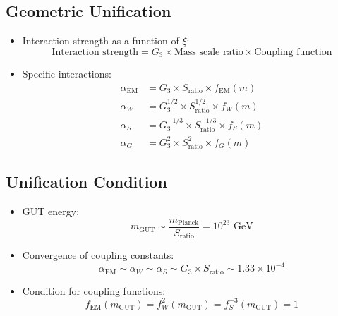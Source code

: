 \documentclass[12pt,a4paper]{article}
\begin{document}
	\subsection{Geometric Unification}
	\begin{itemize}
		\item Interaction strength as a function of $\xi$:
		\begin{equation}
			\text{Interaction strength} = G_3 \times \text{Mass scale ratio} \times \text{Coupling function}
		\end{equation}
		
		\item Specific interactions:
		\begin{align}
			\alpha_{\text{EM}} &= G_3 \times S_{\text{ratio}} \times f_{\text{EM}}(m) \\
			\alpha_W &= G_3^{1/2} \times S_{\text{ratio}}^{1/2} \times f_W(m) \\
			\alpha_S &= G_3^{-1/3} \times S_{\text{ratio}}^{-1/3} \times f_S(m) \\
			\alpha_G &= G_3^2 \times S_{\text{ratio}}^2 \times f_G(m)
		\end{align}
	\end{itemize}
	
	\subsection{Unification Condition}
	\begin{itemize}
		\item GUT energy:
		\begin{equation}
			m_{\text{GUT}} \sim \frac{m_{\text{Planck}}}{S_{\text{ratio}}} = 10^{23} \text{ GeV}
		\end{equation}
		
		\item Convergence of coupling constants:
		\begin{equation}
			\alpha_{\text{EM}} \sim \alpha_W \sim \alpha_S \sim G_3 \times S_{\text{ratio}} \sim 1.33 \times 10^{-4}
		\end{equation}
		
		\item Condition for coupling functions:
		\begin{equation}
			f_{\text{EM}}(m_{\text{GUT}}) = f_W^2(m_{\text{GUT}}) = f_S^{-3}(m_{\text{GUT}}) = 1
		\end{equation}
	\end{itemize}
\end{document}
